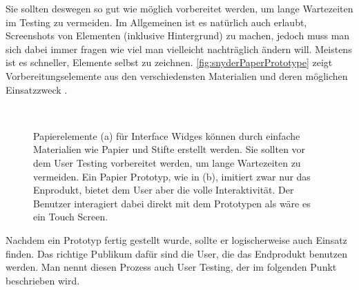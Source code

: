 \medskip Sie sollten deswegen so gut wie möglich vorbereitet werden, um lange Wartezeiten im Testing zu vermeiden. Im Allgemeinen ist es natürlich auch erlaubt, Screenshots von Elementen (inklusive Hintergrund) zu machen, jedoch muss man sich dabei immer fragen wie viel man vielleicht nachträglich ändern will. Meistens ist es schneller, Elemente selbst zu zeichnen. \autoref{fig:snyderPaperPrototype} zeigt Vorbereitungselemente aus den verschiedensten Materialien und deren möglichen Einsatzzweck \citep{Snyder:2003}.

\begin{figure}
	\myfloatalign
	 \quad
	 \\
	\caption[Paper Prototyping \newline \citep{Sagmeister:2008}]{Papierelemente (a) für Interface Widges können durch einfache Materialien wie Papier und Stifte erstellt werden. Sie sollten vor dem User Testing vorbereitet werden, um lange Wartezeiten zu vermeiden. Ein Papier Prototyp, wie in (b), imitiert zwar nur das Enprodukt, bietet dem User aber die volle Interaktivität. Der Benutzer interagiert dabei direkt mit dem Prototypen als wäre es ein Touch Screen.}\label{fig:snyderPaperPrototype}
\end{figure}

\medskip Nachdem ein Prototyp fertig gestellt wurde, sollte er logischerweise auch Einsatz finden. Das richtige Publikum dafür sind die User, die das Endprodukt benutzen werden. Man nennt diesen Prozess auch User Testing, der im folgenden Punkt beschrieben wird.

